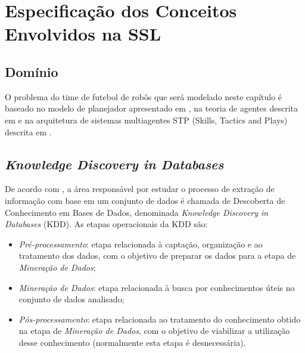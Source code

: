 \chapter{Especificação dos Conceitos Envolvidos na SSL}\label{cap:def_problema}


\section{Domínio}

O problema do time de futebol de robôs que será modelado neste capítulo é baseado
no modelo de planejador apresentado em \cite{zickler}, na teoria de agentes descrita
em \cite{russellnorvig} e na arquitetura de sistemas multiagentes
STP (Skills, Tactics and Plays) descrita em \cite{bowling2003plays}.




\section{\textit{Knowledge Discovery in Databases}}

  De acordo com \cite{passos2005datamining}, a área responsável por estudar o processo
  de extração de informação com base em um conjunto de dados é chamada de Descoberta
  de Conhecimento em Bases de Dados, denominada \textit{Knowledge Discovery in
  Databases} (KDD). As etapas operacionais da KDD são:

  \begin{itemize}
    \item \textit{Pré-processamento}: etapa relacionada à captação,
          organização e ao tratamento dos dados, com o objetivo de
          preparar os dados para a etapa de \textit{Mineração de Dados};
    \item \textit{Mineração de Dados}: etapa relacionada à busca por
          conhecimentos úteis no conjunto de dados analisado;
    \item \textit{Pós-processamento}: etapa relacionada ao tratamento do
          conhecimento obtido na etapa de \textit{Mineração de Dados}, com
          o objetivo de viabilizar a utilização desse conhecimento
          (normalmente esta etapa é desnecessária).
  \end{itemize}


